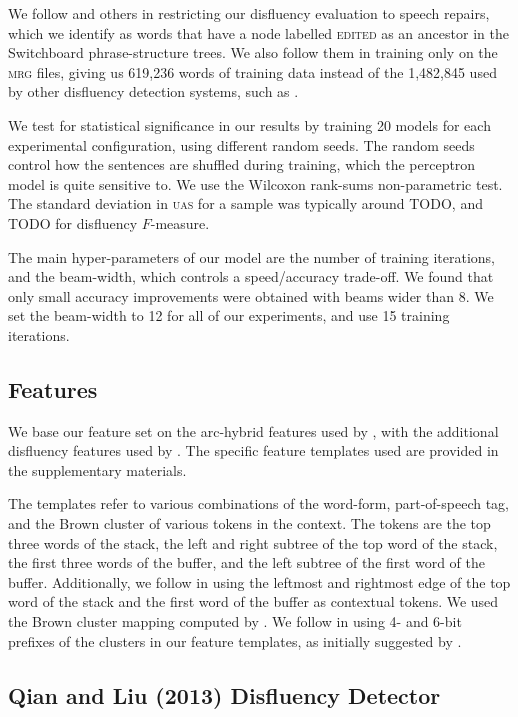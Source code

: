 \documentclass[11pt,letterpaper]{article}
\begin{document}
We follow \citet{Johnson04a} and others in restricting our disfluency evaluation
to speech repairs, which we identify as words that have a node labelled \textsc{edited}
as an ancestor in the Switchboard phrase-structure trees.  We also follow them
in training only on the \textsc{mrg} files, giving us 619,236 words of training
data instead of the 1,482,845 used by other disfluency detection systems, such
as \citet{qian:13}.

We test for statistical significance in our results by training 20 models for
each experimental configuration, using different random seeds. The random seeds
control how the sentences are shuffled during training, which the perceptron
model is quite sensitive to.  We use the Wilcoxon rank-sums non-parametric test.
The standard deviation in \textsc{uas} for a sample was typically around TODO,
and TODO for disfluency $F$-measure.

The main hyper-parameters of our model are the number of training iterations,
and the beam-width, which controls a speed/accuracy trade-off.  We found that
only small accuracy improvements were obtained with beams wider than 8. We set
the beam-width to 12 for all of our experiments, and use 15 training iterations.

\subsection{Features}

We base our feature set on the arc-hybrid features used by
\citet{goldberg:13},
with the additional disfluency features used by \citet{honnibal:14}.  The
specific feature templates used are provided in the supplementary materials.

The templates refer to various combinations of the word-form, part-of-speech tag,
and the Brown cluster \citep{brown:92} of various tokens
in the context.  The tokens are the top three words of the stack, the left and
right subtree of the top word of the stack, the first three words of the buffer,
and the left subtree of the first word of the buffer.  Additionally, we follow
\citet{honnibal:14} in using the leftmost and rightmost edge of the top word
of the stack and the first word of the buffer as contextual tokens.
We used the Brown cluster mapping computed by \citet{liang:05}.
We follow \citet{honnibal:14}
in using 4- and 6-bit prefixes of the clusters in our feature templates, as
initially suggested by \citet{koo:10}.

\subsection{Qian and Liu (2013) Disfluency Detector}
\end{document}
